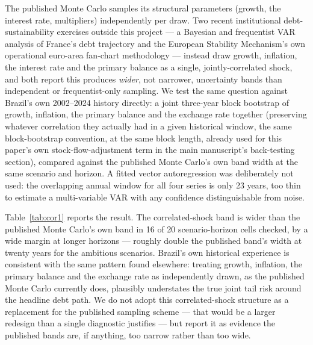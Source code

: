 \documentclass[11pt,a4paper]{article}
\begin{document}
The published Monte Carlo samples its structural parameters (growth, the interest rate, multipliers) independently per draw. Two recent institutional debt-sustainability exercises outside this project --- a Bayesian and frequentist VAR analysis of France's debt trajectory \citep{baretbeccochard2025} and the European Stability Mechanism's own operational euro-area fan-chart methodology \citep{hitajzavallonizigraiova2025} --- instead draw growth, inflation, the interest rate and the primary balance as a single, jointly-correlated shock, and both report this produces \emph{wider}, not narrower, uncertainty bands than independent or frequentist-only sampling. We test the same question against Brazil's own 2002--2024 history directly: a joint three-year block bootstrap of growth, inflation, the primary balance and the exchange rate together (preserving whatever correlation they actually had in a given historical window, the same block-bootstrap convention, at the same block length, already used for this paper's own stock-flow-adjustment term in the main manuscript's back-testing section), compared against the published Monte Carlo's own band width at the same scenario and horizon. A fitted vector autoregression was deliberately not used: the overlapping annual window for all four series is only 23 years, too thin to estimate a multi-variable VAR with any confidence distinguishable from noise.

Table~\ref{tab:cor1} reports the result. The correlated-shock band is wider than the published Monte Carlo's own band in 16 of 20 scenario-horizon cells checked, by a wide margin at longer horizons --- roughly double the published band's width at twenty years for the ambitious scenarios. Brazil's own historical experience is consistent with the same pattern found elsewhere: treating growth, inflation, the primary balance and the exchange rate as independently drawn, as the published Monte Carlo currently does, plausibly understates the true joint tail risk around the headline debt path. We do not adopt this correlated-shock structure as a replacement for the published sampling scheme --- that would be a larger redesign than a single diagnostic justifies --- but report it as evidence the published bands are, if anything, too narrow rather than too wide.
\end{document}
